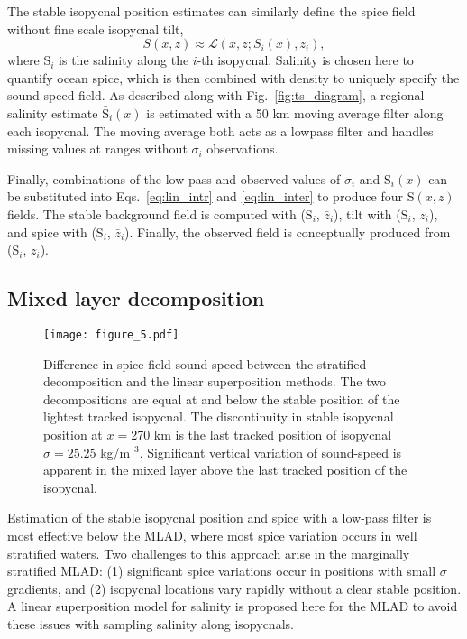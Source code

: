 \documentclass[preprint,NumberedRefs]{JASA}
\begin{document}
The stable isopycnal position estimates can similarly define the spice field without fine scale isopycnal tilt,
\begin{equation}
    S(x, z)\approx\mathcal{L}(x, z; S_i(x), z_i),
    \label{eq:lin_inter}
\end{equation}
where S$_i$ is the salinity along the $i$-th isopycnal. Salinity is chosen here to quantify ocean spice, which is then combined with density to uniquely specify the sound-speed field\citep{TEOS10}. As described along with Fig.~\ref{fig:ts_diagram}, a regional salinity estimate $\bar{\textrm{S}}_i(x)$ is estimated with a 50 km moving average filter along each isopycnal. The moving average both acts as a lowpass filter and handles missing values at ranges without $\sigma_i$ observations.

Finally, combinations of the low-pass and observed values of $\sigma_i$ and S$_i(x)$ can be substituted into Eqs.~\eqref{eq:lin_intr} and \eqref{eq:lin_inter} to produce four S$(x,z)$ fields. The stable background field is computed with ($\bar{\textrm{S}}_i$, $\bar{z}_i$), tilt with ($\bar{\textrm{S}}_i$, $z_i$), and spice with (S$_i$, $\bar{z}_i$). Finally, the observed field is conceptually produced from (S$_i$, $z_i$).

\subsection{Mixed layer decomposition}\label{ssec:ml_decomp}
\begin{figure}
\texttt{[image: figure\_5.pdf]}
    \caption{\label{fig:c_diff}{Difference in spice field sound-speed between the stratified decomposition and the linear superposition methods. The two decompositions are equal at and below the stable position of the lightest tracked isopycnal. The discontinuity in stable isopycnal position at $x=$270 km is the last tracked position of isopycnal $\sigma=25.25$ kg/m $^3$. Significant vertical variation of sound-speed is apparent in the mixed layer above the last tracked position of the isopycnal.}}
\end{figure}

Estimation of the stable isopycnal position and spice with a low-pass filter is most effective below the MLAD, where most spice variation occurs in well stratified waters. Two challenges to this approach arise in the marginally stratified MLAD: (1) significant spice variations occur in positions with small $\sigma$ gradients, and (2) isopycnal locations vary rapidly without a clear stable position. A linear superposition model for salinity is proposed here for the MLAD to avoid these issues with sampling salinity along isopycnals.
\end{document}
